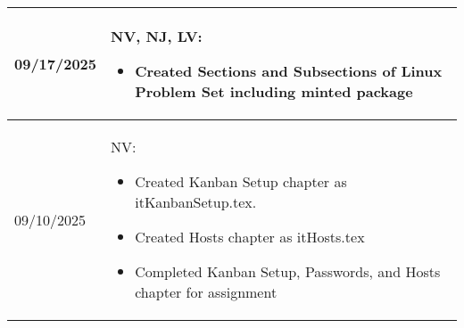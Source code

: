 \begin{longtable}{|l||p{13.5cm}|}
09/17/2025 & NV, NJ, LV:
\begin{itemize}[topsep=0pt,itemsep=0pt,parsep=0pt,partopsep=0pt,leftmargin=12pt]
\item Created Sections and Subsections of Linux Problem Set including minted package
\end{itemize} 
\\ \hline

09/10/2025 & NV:
\begin{itemize}[topsep=0pt,itemsep=0pt,parsep=0pt,partopsep=0pt,leftmargin=12pt]
\item Created Kanban Setup chapter as itKanbanSetup.tex.
\item Created Hosts chapter as itHosts.tex
\item Completed Kanban Setup, Passwords, and Hosts chapter for assignment
\end{itemize} 
\\ \hline



\end{longtable}


